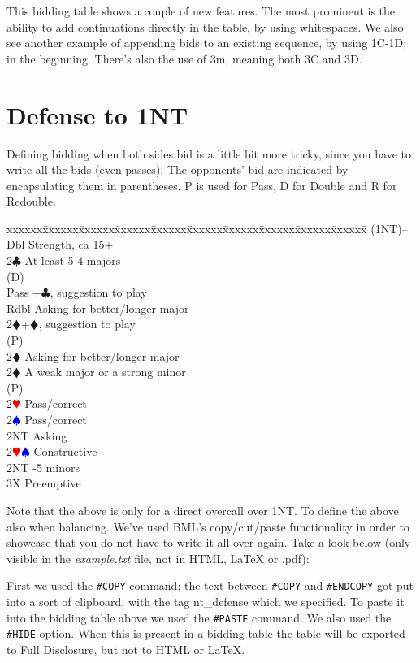 \documentclass[a4paper]{article}
\newcommand{\BC}{\textcolor{OliveGreen}{$\clubsuit$}}
\newcommand{\BD}{\textcolor{RedOrange}{$\vardiamondsuit$}}
\newcommand{\BH}{\textcolor{Red}{$\varheartsuit${}}}
\newcommand{\BS}{\textcolor{Blue}{$\spadesuit${}}}
\newenvironment{bidtable}
{\begin{tabbing}

xxxxxx\=xxxxxx\=xxxxxx\=xxxxxx\=xxxxxx\=xxxxxx\=xxxxxx\=xxxxxx\=xxxxxx\=xxxxxx\=\kill}
{\end{tabbing} }%
\begin{document}
This bidding table shows a couple of new features. The most
prominent is the ability to add continuations directly in the
table, by using whitespaces. We also see another example of
appending bids to an existing sequence, by using 1C-1D; in the
beginning. There's also the use of 3m, meaning both 3C and 3D.

\section{Defense to 1NT}

Defining bidding when both sides bid is a little bit more tricky,
since you have to write all the bids (even passes). The opponents'
bid are indicated by encapsulating them in parentheses. P is used
for Pass, D for Double and R for Redouble.

\begin{bidtable}
(1NT)--\+\\
Dbl \> Strength, ca 15+\\
2\BC \> At least 5-4 majors\+\\
(D)\+\\
Pass +\BC , suggestion to play\\
Rdbl \> Asking for better/longer major\\
2\BD {}+\BD , suggestion to play\-\\
(P)\+\\
2\BD \> Asking for better/longer major\-\-\\
2\BD \> A weak major or a strong minor\+\\
(P)\+\\
2\BH \> Pass/correct\\
2\BS \> Pass/correct\\
2NT \> Asking\-\-\\
2\BH\BS \> Constructive\\
2NT -5 minors\\
3X \> Preemptive\-
\end{bidtable}

Note that the above is only for a direct overcall over 1NT. To
define the above also when balancing. We've used BML's
copy/cut/paste functionality in order to showcase that you do not
have to write it all over again. Take a look below (only visible in
the \emph{example.txt} file, not in HTML, LaTeX or .pdf):

First we used the \texttt{\#COPY} command; the text between \texttt{\#COPY} and \texttt{\#ENDCOPY}
got put into a sort of clipboard, with the tag nt\_defense which we
specified. To paste it into the bidding table above we used
the \texttt{\#PASTE} command. We also used the \texttt{\#HIDE} option. When this is
present in a bidding table the table will be exported to Full
Disclosure, but not to HTML or LaTeX.
\end{document}
